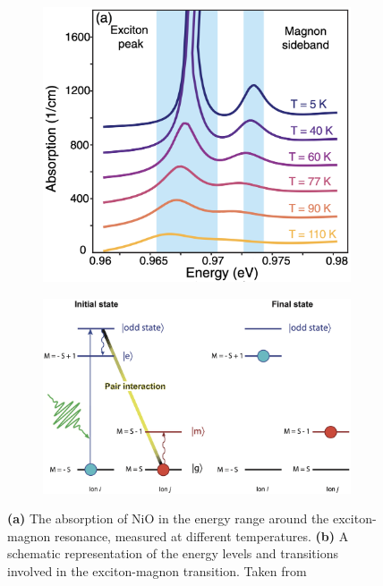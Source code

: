 \begin{figure}[ht]
    \centering
    \begin{subfigure}[b]{0.3\textwidth}
        \includegraphics[width=\textwidth]{pictures/5.png}
        \caption{}
        \label{fig:5}
    \end{subfigure}
    \hspace{1cm}
    \begin{subfigure}[b]{0.6\textwidth}
        \includegraphics[width=\textwidth]{pictures/6.png}
        \caption{}
        \label{fig:6}
    \end{subfigure}
    \caption{\textbf{(a)} The absorption of NiO in the energy range around the exciton-magnon resonance, measured at different temperatures. \textbf{(b)} A schematic representation of the energy levels and transitions involved in the exciton-magnon transition. Taken from }
\end{figure}
